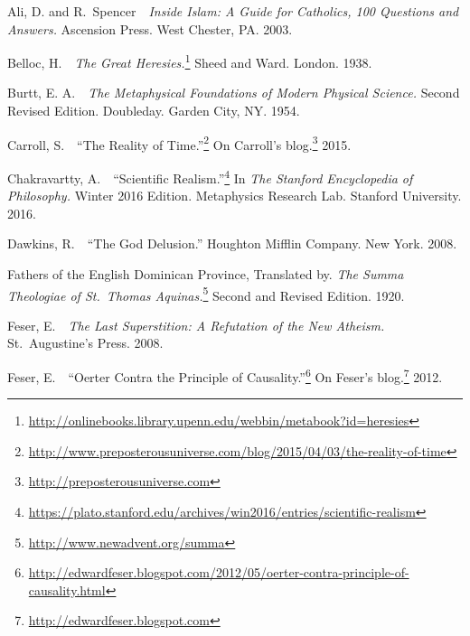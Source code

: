 \documentclass[twocolumn]{article}
\begin{document}
\begin{thebibliography}{}

   \begin{small}

      Ali, D. and R.~Spencer\ \ {\it Inside Islam: A Guide for Catholics, 100
      Questions and Answers.}  Ascension Press.  West Chester, PA.  2003.

      Belloc, H.\ \ {\it The Great Heresies.}\footnote{%
         \url{http://onlinebooks.library.upenn.edu/webbin/metabook?id=heresies}
      }
      Sheed and Ward.  London.  1938.

      Burtt, E. A.\ \ {\it The Metaphysical Foundations of Modern Physical
      Science.}  Second Revised Edition.  Doubleday.  Garden City, NY.  1954.

      Carroll, S.\ \ ``The Reality of Time.''\footnote{%
         \url{http://www.preposterousuniverse.com/blog/2015/04/03/the-reality-of-time}%
      }
      On Carroll's blog.\footnote{\url{http://preposterousuniverse.com}}  2015.

      Chakravartty, A.\ \ ``Scientific Realism.''\footnote{%
         \url{https://plato.stanford.edu/archives/win2016/entries/scientific-realism}%
      }
      In {\it The Stanford Encyclopedia of Philosophy.}  Winter 2016 Edition.
      Metaphysics Research Lab.  Stanford University.  2016.

      Dawkins, R.\ \ ``The God Delusion.''  Houghton Mifflin Company.  New
      York.  2008.

      Fathers of the English Dominican Province, Translated by. {\it The
      Summa Theologiae of St.~Thomas Aquinas.}\footnote{%
         \url{http://www.newadvent.org/summa}%
      }
      Second and Revised Edition.  1920.

      Feser, E.\ \ {\it The Last Superstition: A Refutation of the New
      Atheism.}  St.~Augustine's Press.  2008.

      Feser, E.\ \ ``Oerter Contra the Principle of Causality.''\footnote{%
         \url{http://edwardfeser.blogspot.com/2012/05/oerter-contra-principle-of-causality.html}
      }
      On Feser's blog.\footnote{\url{http://edwardfeser.blogspot.com}}  2012.


\end{small}
\end{thebibliography}
\end{document}
